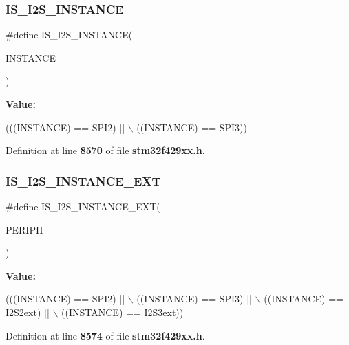 \subsubsection{I\+S\+\_\+\+I2\+S\+\_\+\+I\+N\+S\+T\+A\+N\+CE}
{\footnotesize\ttfamily \#define I\+S\+\_\+\+I2\+S\+\_\+\+I\+N\+S\+T\+A\+N\+CE(\begin{DoxyParamCaption}\item[{}]{I\+N\+S\+T\+A\+N\+CE }\end{DoxyParamCaption})}

{\bfseries Value\+:}
\begin{DoxyCode}
(((INSTANCE) == SPI2) || \(\backslash\)
                                    ((INSTANCE) == SPI3))
\end{DoxyCode}


Definition at line \textbf{ 8570} of file \textbf{ stm32f429xx.\+h}.

\mbox{\label{group__Exported__macros_ga46d8a3fae3ae7d9c309fc87857924bc0}} 
\subsubsection{I\+S\+\_\+\+I2\+S\+\_\+\+I\+N\+S\+T\+A\+N\+C\+E\+\_\+\+E\+XT}
{\footnotesize\ttfamily \#define I\+S\+\_\+\+I2\+S\+\_\+\+I\+N\+S\+T\+A\+N\+C\+E\+\_\+\+E\+XT(\begin{DoxyParamCaption}\item[{}]{P\+E\+R\+I\+PH }\end{DoxyParamCaption})}

{\bfseries Value\+:}
\begin{DoxyCode}
(((INSTANCE) == SPI2)    || \(\backslash\)
                                      ((INSTANCE) == SPI3)    || \(\backslash\)
                                      ((INSTANCE) == I2S2ext) || \(\backslash\)
                                      ((INSTANCE) == I2S3ext))
\end{DoxyCode}


Definition at line \textbf{ 8574} of file \textbf{ stm32f429xx.\+h}.

\mbox{\label{group__Exported__macros_ga98ae6698dc54d8441fce553a65bf5429}} 
